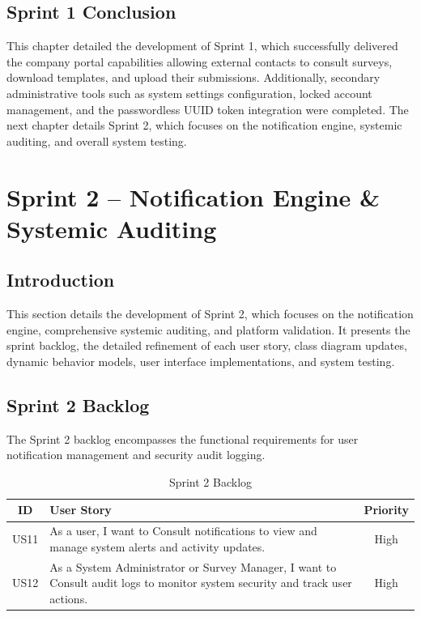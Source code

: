\documentclass[12pt,a4paper]{report}
\begin{document}
\section{Sprint 1 Conclusion}
This chapter detailed the development of Sprint 1, which successfully delivered the company portal capabilities allowing external contacts to consult surveys, download templates, and upload their submissions. Additionally, secondary administrative tools such as system settings configuration, locked account management, and the passwordless UUID token integration were completed. The next chapter details Sprint 2, which focuses on the notification engine, systemic auditing, and overall system testing.

\newpage
\chapter{Sprint 2 -- Notification Engine \& Systemic Auditing}

\section{Introduction}
This section details the development of Sprint 2, which focuses on the notification engine, comprehensive systemic auditing, and platform validation. It presents the sprint backlog, the detailed refinement of each user story, class diagram updates, dynamic behavior models, user interface implementations, and system testing.

\section{Sprint 2 Backlog}
The Sprint 2 backlog encompasses the functional requirements for user notification management and security audit logging.

\begin{table}[H]
\centering
\caption{Sprint 2 Backlog}
\vspace{0.3cm}
\renewcommand{\arraystretch}{1.3}
\begin{tabular}{|c|p{11cm}|c|}
\hline
\textbf{ID} & \textbf{User Story} & \textbf{Priority} \\ \hline
US11 & As a user, I want to Consult notifications to view and manage system alerts and activity updates. & High \\ \hline
US12 & As a System Administrator or Survey Manager, I want to Consult audit logs to monitor system security and track user actions. & High \\ \hline
\end{tabular}
\end{table}
\end{document}
